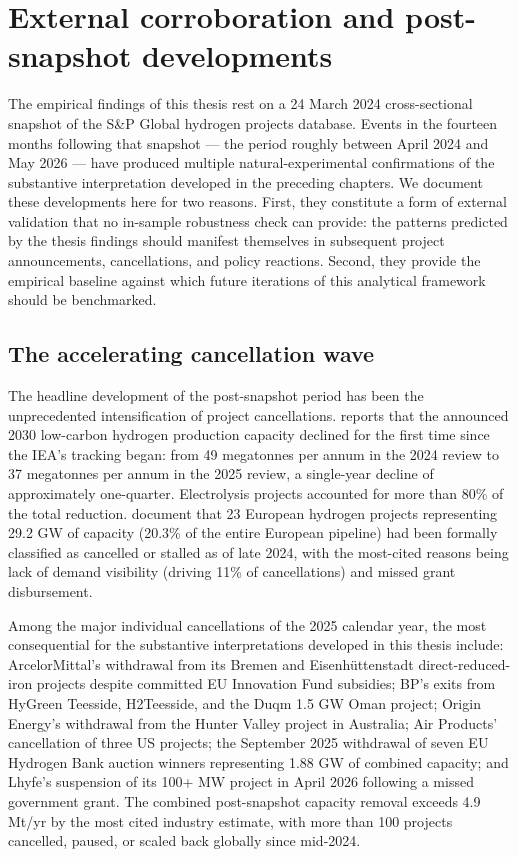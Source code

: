 \section{External corroboration and post-snapshot developments}

The empirical findings of this thesis rest on a 24 March 2024 cross-sectional snapshot of the S\&P Global hydrogen projects database. Events in the fourteen months following that snapshot --- the period roughly between April 2024 and May 2026 --- have produced multiple natural-experimental confirmations of the substantive interpretation developed in the preceding chapters. We document these developments here for two reasons. First, they constitute a form of external validation that no in-sample robustness check can provide: the patterns predicted by the thesis findings should manifest themselves in subsequent project announcements, cancellations, and policy reactions. Second, they provide the empirical baseline against which future iterations of this analytical framework should be benchmarked.

\subsection*{The accelerating cancellation wave}

The headline development of the post-snapshot period has been the unprecedented intensification of project cancellations. \cite{iea2025hydrogen} reports that the announced 2030 low-carbon hydrogen production capacity declined for the first time since the IEA's tracking began: from 49 megatonnes per annum in the 2024 review to 37 megatonnes per annum in the 2025 review, a single-year decline of approximately one-quarter. Electrolysis projects accounted for more than 80\% of the total reduction. \cite{westwood2024hydrogen} document that 23 European hydrogen projects representing 29.2 GW of capacity (20.3\% of the entire European pipeline) had been formally classified as cancelled or stalled as of late 2024, with the most-cited reasons being lack of demand visibility (driving 11\% of cancellations) and missed grant disbursement.

Among the major individual cancellations of the 2025 calendar year, the most consequential for the substantive interpretations developed in this thesis include: ArcelorMittal's withdrawal from its Bremen and Eisenhüttenstadt direct-reduced-iron projects despite committed EU Innovation Fund subsidies; BP's exits from HyGreen Teesside, H2Teesside, and the Duqm 1.5 GW Oman project; Origin Energy's withdrawal from the Hunter Valley project in Australia; Air Products' cancellation of three US projects; the September 2025 withdrawal of seven EU Hydrogen Bank auction winners representing 1.88 GW of combined capacity; and Lhyfe's suspension of its 100+ MW project in April 2026 following a missed government grant. The combined post-snapshot capacity removal exceeds 4.9 Mt/yr by the most cited industry estimate, with more than 100 projects cancelled, paused, or scaled back globally since mid-2024.

